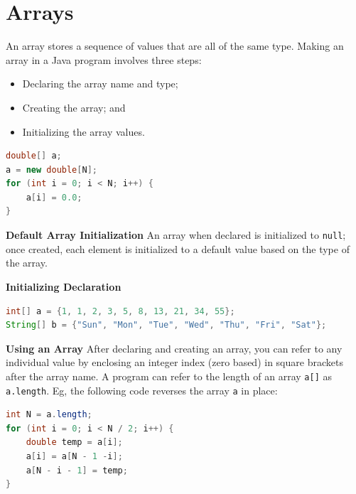 \documentclass[8pt,a4paper,compress]{beamer}
\begin{document}
\section{Arrays}
\begin{frame}[fragile]
\pause

An array stores a sequence of values that are all of the same type. Making an array in a Java program involves three steps:
\begin{itemize}
\item Declaring the array name and type; 
\item Creating the array; and
\item Initializing the array values.
\end{itemize}
\begin{lstlisting}[language=Java]
double[] a;
a = new double[N];
for (int i = 0; i < N; i++) {
    a[i] = 0.0;
}
\end{lstlisting}

\pause
\smallskip
\textbf{Default Array Initialization} An array when declared is initialized to \lstinline$null$; once created, each element is initialized to a default value based on the type of the array.

\pause
\smallskip
\textbf{Initializing Declaration}
\begin{lstlisting}[language=Java]
int[] a = {1, 1, 2, 3, 5, 8, 13, 21, 34, 55};
String[] b = {"Sun", "Mon", "Tue", "Wed", "Thu", "Fri", "Sat"};
\end{lstlisting}

\pause
\smallskip
\textbf{Using an Array} After declaring and creating an array, you can refer to any individual value by enclosing an integer index (zero based) in square brackets after the array name. A program can refer to the length of an array \lstinline$a[]$ as \lstinline$a.length$. Eg, the following code reverses the array \lstinline$a$ in place:
\begin{lstlisting}[language=Java]
int N = a.length;
for (int i = 0; i < N / 2; i++) {
    double temp = a[i];
    a[i] = a[N - 1 -i];
    a[N - i - 1] = temp;
}
\end{lstlisting}
\end{frame}
\end{document}
